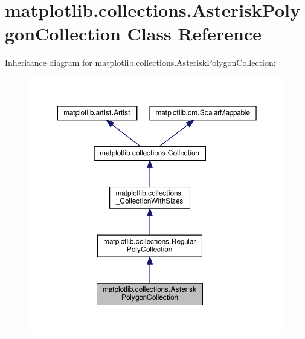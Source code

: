 \hypertarget{classmatplotlib_1_1collections_1_1AsteriskPolygonCollection}{}\section{matplotlib.\+collections.\+Asterisk\+Polygon\+Collection Class Reference}
\label{classmatplotlib_1_1collections_1_1AsteriskPolygonCollection}


Inheritance diagram for matplotlib.\+collections.\+Asterisk\+Polygon\+Collection\+:
\nopagebreak
\begin{figure}[H]
\begin{center}
\leavevmode
\includegraphics[width=350pt]{classmatplotlib_1_1collections_1_1AsteriskPolygonCollection__inherit__graph}
\end{center}
\end{figure}


